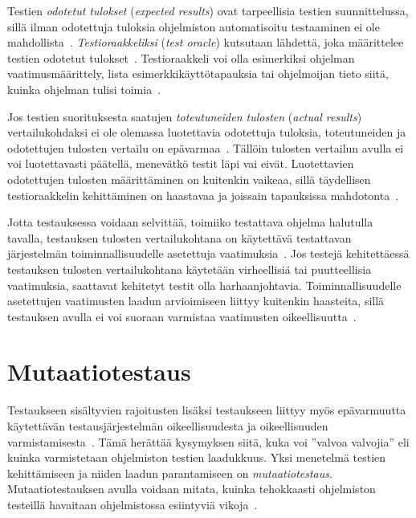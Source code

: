 \documentclass[finnish, grading]{tktltiki2}
\theoremstyle{definition}
\theoremstyle{remark}
\begin{document}
Testien \textit{odotetut tulokset} (\textit{expected results}) ovat tarpeellisia testien suunnittelussa, sillä ilman odotettuja tuloksia ohjelmiston automatisoitu testaaminen ei ole mahdollista~\cite[s. 917]{Binder:1999}. \textit{Testioraakkeliksi} (\textit{test oracle}) kutsutaan lähdettä, joka määrittelee testien odotetut tulokset~\cite[s. 917]{Binder:1999}. Testioraakkeli voi olla esimerkiksi ohjelman vaatimusmäärittely, lista esimerkkikäyttötapauksia tai ohjelmoijan tieto siitä, kuinka ohjelman tulisi toimia~\cite[s. 918]{Binder:1999}. 

Jos testien suorituksesta saatujen \textit{toteutuneiden tulosten} (\textit{actual results}) vertailukohdaksi ei ole olemassa luotettavia odotettuja tuloksia, toteutuneiden ja odotettujen tulosten vertailu on epävarmaa~\cite[s. 58]{Binder:1999}. Tällöin tulosten vertailun avulla ei voi luotettavasti päätellä, menevätkö testit läpi vai eivät. Luotettavien odotettujen tulosten määrittäminen on kuitenkin vaikeaa, sillä täydellisen testioraakkelin kehittäminen on haastavaa ja joissain tapauksissa mahdotonta~\cite[s. 58, 918]{Binder:1999}.

Jotta testauksessa voidaan selvittää, toimiiko testattava ohjelma halutulla tavalla, testauksen tulosten vertailukohtana on käytettävä testattavan järjestelmän toiminnallisuudelle asetettuja vaatimuksia~\cite[s. 58]{Binder:1999}. Jos testejä kehitettäessä testauksen tulosten vertailukohtana käytetään virheellisiä tai puutteellisia vaatimuksia, saattavat kehitetyt testit olla harhaanjohtavia. Toiminnallisuudelle asetettujen vaatimusten laadun arvioimiseen liittyy kuitenkin haasteita, sillä testauksen avulla ei voi suoraan varmistaa vaatimusten oikeellisuutta~\cite[s. 58]{Binder:1999}.


\section{Mutaatiotestaus}

Testaukseen sisältyvien rajoitusten lisäksi testaukseen liittyy myös epävarmuutta käytettävän testausjärjestelmän oikeellisuudesta ja oikeellisuuden varmistamisesta~\cite[s. 209]{Manna:Waldinger:1978}. Tämä herättää kysymyksen siitä, kuka voi ''valvoa valvojia'' eli kuinka varmistetaan ohjelmiston testien laadukkuus. Yksi menetelmä testien kehittämiseen ja niiden laadun parantamiseen on \textit{mutaatiotestaus}. Mutaatiotestauksen avulla voidaan mitata, kuinka tehokkaasti ohjelmiston testeillä havaitaan ohjelmistossa esiintyviä vikoja~\cite[s. 649]{Jia:Harman:2011}.
\end{document}
